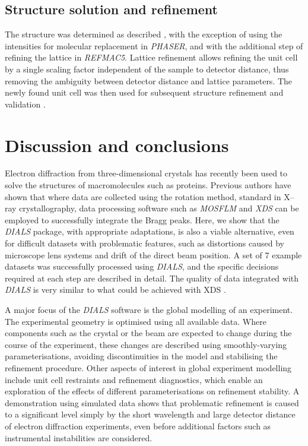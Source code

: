 \documentclass[preprint]{iucr}
\newcommand{\dials}{\emph{DIALS}\xspace}
\newcommand{\xds}{\emph{XDS}\xspace}
\newcommand{\mosflm}{\emph{MOSFLM}\xspace}
\newcommand{\refmac}{\emph{REFMAC5}\xspace}
\newcommand{\phaser}{\emph{PHASER}\xspace}
\begin{document}
\subsection{Structure solution and refinement \label{sec:phase-refine}}

The structure was determined as described \cite{Clabbers2017}, with the exception of
using the intensities for molecular replacement in \phaser \cite{McCoy2007,Read2016},
and with the additional step of refining the lattice in \refmac \cite{Murshudov2011}.
Lattice refinement allows refining the unit cell by a single scaling factor independent
of the sample to detector distance, thus removing the ambiguity between detector
distance and lattice parameters. The newly found unit cell was then used for subsequent
structure refinement and validation \cite{Murshudov2011,Joosten2014,Luebben2015}.


\section{Discussion and conclusions}

Electron diffraction from three-dimensional crystals has recently been used to
solve the structures of macromolecules such as proteins. Previous authors have
shown that where data are collected using the rotation method, standard in
X--ray crystallography, data processing software such as \mosflm and
\xds can be employed to successfully integrate the Bragg peaks. Here, we show
that the \dials package, with appropriate adaptations, is also a viable
alternative, even for difficult datasets with problematic features, such as
distortions caused by microscope lens systems and drift of the direct beam
position. A set of 7 example datasets was successfully processed using \dials,
and the specific decisions required at each step are described in detail. The
quality of data integrated with \dials is very similar to what could be achieved
with XDS \cite{Clabbers2017}.

A major focus of the \dials software is the global modelling of an experiment.
The experimental geometry is optimised using all available data. Where
components such as the crystal or the beam are expected to change during the
course of the experiment, these changes are described using smoothly-varying
parameterisations, avoiding discontinuities in the model and stabilising the
refinement procedure. Other aspects of interest in global experiment modelling
include unit cell restraints and refinement diagnostics, which enable an
exploration of the effects of different parameterisations on refinement
stability. A demonstration using simulated data shows that problematic
refinement is caused to a significant level simply by the short wavelength and
large detector distance of electron diffraction experiments, even before
additional factors such as instrumental instabilities are considered.
\end{document}
